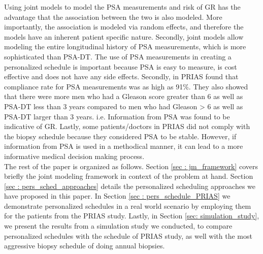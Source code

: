 Using joint models to model the PSA measurements and risk of GR has the advantage that the association between the two is also modeled. More importantly, the association is modeled via random effects, and therefore the models have an inherent patient specific nature. Secondly, joint models allow modeling the entire longitudinal history of PSA measurements, which is more sophisticated than PSA-DT. The use of PSA measurements in creating a personalized schedule is important because PSA is easy to measure, is cost effective and does not have any side effects. Secondly, in PRIAS \cite{bokhorst2015compliance} found that compliance rate for PSA measurements was as high as 91\%. They also showed that there were more men who had a Gleason score greater than 6 as well as PSA-DT less than 3 years compared to men who had Gleason > 6 as well as PSA-DT larger than 3 years. i.e. Information from PSA was found to be indicative of GR. Lastly, some patients/doctors in PRIAS did not comply with the biopsy schedule because they considered PSA to be stable. However, if information from PSA is used in a methodical manner, it can lead to a more informative medical decision making process.\\

The rest of the paper is organized as follows. Section \ref{sec : jm_framework} covers briefly the joint modeling framework in context of the problem at hand. Section \ref{sec : pers_sched_approaches} details the personalized scheduling approaches we have proposed in this paper. In Section \ref{sec : pers_schedule_PRIAS} we demonstrate personalized schedules in a real world scenario by employing them for the patients from the PRIAS study. Lastly, in Section \ref{sec: simulation_study}, we present the results from a simulation study we conducted, to compare personalized schedules with the schedule of PRIAS study, as well with the most aggressive biopsy schedule of doing annual biopsies.